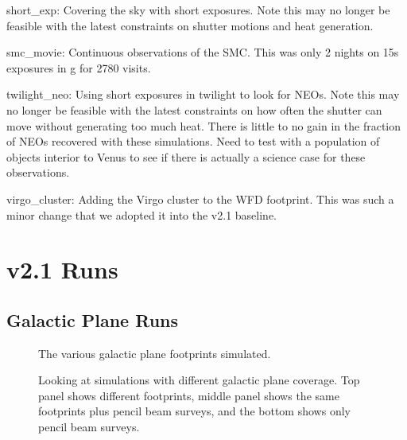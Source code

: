 short\_exp: Covering the sky with short exposures. Note this may no longer be feasible with the latest constraints on shutter motions and heat generation.

smc\_movie: Continuous observations of the SMC. This was only 2 nights on 15s exposures in g for 2780 visits. 

twilight\_neo:  Using short exposures in twilight to look for NEOs. Note this may no longer be feasible with the latest constraints on how often the shutter can move without generating too much heat. There is little to no gain in the fraction of NEOs recovered with these simulations. Need to test with a population of objects interior to Venus to see if there is actually a science case for these observations.  

virgo\_cluster:  Adding the Virgo cluster to the WFD footprint. This was such a minor change that we adopted it into the v2.1 baseline.


\section{v2.1 Runs}

\subsection{Galactic Plane Runs}

\begin{figure}
\caption{The various galactic plane footprints simulated.}
\end{figure}


\begin{figure}
\caption{Looking at simulations with different galactic plane coverage. Top panel shows different footprints, middle panel shows the same footprints plus pencil beam surveys, and the bottom shows only pencil beam surveys. \label{fig:gal_plane_radar}}
\end{figure}


